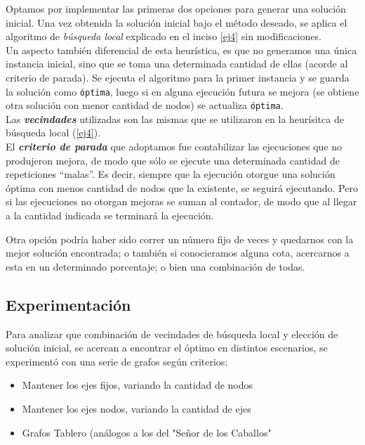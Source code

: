 Optamos por implementar las primeras dos opciones para generar una solución inicial. Una vez obtenida la solución inicial bajo el método deseado, se aplica el algoritmo de \emph{b\'usqueda local} explicado en el inciso \ref{ej4} sin modificaciones.\\

Un aspecto tambi\'en diferencial de esta heur\'istica, es que no generamos una \'unica instancia inicial, sino que se toma una determinada cantidad de ellas (acorde al criterio de parada). Se ejecuta el algoritmo para la primer instancia y se guarda la solución como \texttt{\'optima}, luego si en alguna ejecución futura se mejora (se obtiene otra solución con menor cantidad de nodos) se actualiza \texttt{\'optima}.\\

Las \emph{\textbf{vecindades}} utilizadas son las mismas que se utilizaron en la heur\'isitca de b\'usqueda local (\ref{ej4}).\\

El \emph{\textbf{criterio de parada}} que adoptamos fue contabilizar las ejecuciones que no produjeron mejora, de modo que sólo se ejecute una determinada cantidad de repeticiones ``malas''. Es decir, siempre que la ejecución otorgue una solución óptima con menos cantidad de nodos que la existente, se seguirá ejecutando. Pero si las ejecuciones no otorgan mejoras se suman al contador, de modo que al llegar a la cantidad indicada se terminará la ejecución.

Otra opci\'on podr\'ia haber sido correr un n\'umero fijo de veces y quedarnos con la mejor soluci\'on encontrada; o tambi\'en si conocieramos alguna cota, acercarnos a esta en un determinado porcentaje; o bien una combinaci\'on de todas.


\newpage
\subsection{Experimentaci\'on}

Para analizar que combinaci\'on de vecindades de b\'usqueda local y elecci\'on de soluci\'on inicial, se acercan a encontrar el \'optimo en distintos escenarios, se experiment\'o con una serie de grafos seg\'un criterios:
\begin{itemize}
	\item Mantener los ejes fijos, variando la cantidad de nodos
	\item Mantener los ejes nodos, variando la cantidad de ejes
	\item Grafos Tablero (an\'alogos a los del "Se\~nor de los Caballos"
\end{itemize}

